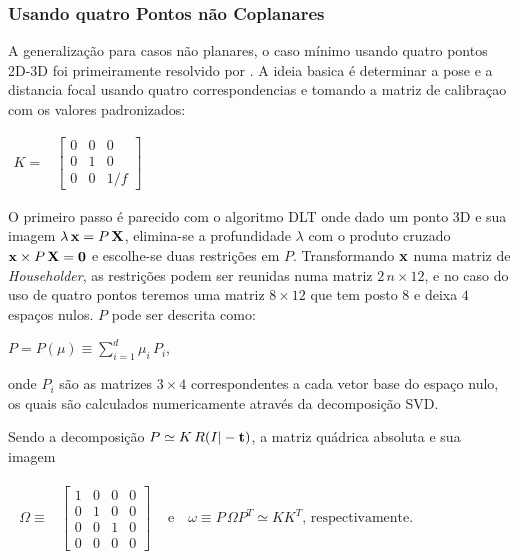 \subsubsection{Usando quatro Pontos não Coplanares}
A generalização para casos não planares, o caso mínimo usando quatro pontos 2D-3D foi primeiramente resolvido por \cite{triggs}. A ideia basica é determinar a pose e a distancia focal usando quatro correspondencias e tomando a matriz de calibraçao com os valores padronizados:

\begin{center}
$\begin{array}{cc}
K =  & \begin{bmatrix}
 0 & 0 & 0 \\ 
 0 & 1 & 0 \\ 
 0 & 0 & 1/f
\end{bmatrix} 
\end{array}$
\end{center}

O primeiro passo é parecido com o algoritmo DLT onde dado um ponto 3D e sua imagem $\lambda\,{\bf x} = P\,{\bf X}$, elimina-se a profundidade $\lambda$ com o produto cruzado ${\bf x}\times P\,{\bf X} = {\bf 0}$ e escolhe-se duas restrições em $P$. Transformando ${\bf x}$ numa matriz de \textit{Householder}, as restrições podem ser reunidas numa matriz $2\,n\times 12$, e no caso do uso de quatro pontos teremos uma matriz $8\times 12$ que tem posto $8$ e deixa $4$ espaços nulos. $P$ pode ser descrita como:

\begin{center}
$P = P(\mu)\equiv\sum_{i=1}^d{\mu_i\,P_i} $,
\end{center}

onde $P_i$ são as matrizes $3\times 4$ correspondentes a cada vetor base do espaço nulo, os quais são calculados numericamente através da decomposição SVD.

Sendo a decomposição $P\simeq K\,R(I| -{\bf t})$, a matriz quádrica absoluta e sua imagem

\begin{center}$
\begin{array}{cc}
\begin{array}{cc}
\Omega \equiv  & \begin{bmatrix}
1 & 0 & 0 & 0 \\ 
0 & 1 & 0 & 0 \\ 
0 & 0 & 1 & 0 \\ 
0 & 0 & 0 & 0
\end{bmatrix} 
\end{array} 
 & \text{e} \quad \omega \equiv P\,\Omega P^{T} \simeq KK^{T} \text{, respectivamente.}
\end{array}$ 
\end{center}

